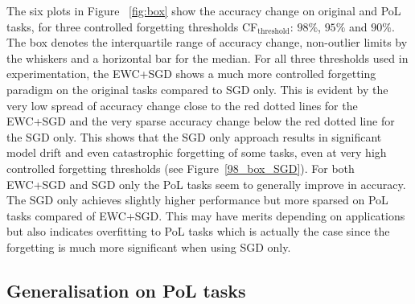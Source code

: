 The six plots in Figure ~\ref{fig:box} show the accuracy change on original and PoL tasks, for three controlled forgetting thresholds CF$_{\text{threshold}}$: $98\%$,  $95\%$ and $90\%$.
%
The box denotes the interquartile range of accuracy change, non-outlier limits by the whiskers and a horizontal bar for the median. 
%
For all three thresholds used in experimentation, the EWC+SGD shows a much more controlled forgetting paradigm on the original tasks compared to SGD only. 
%
This is evident by the very low spread of accuracy change close to the red dotted lines for the EWC+SGD and the very sparse accuracy change below the red dotted line for the SGD only.
%
This shows that the SGD only approach results in significant model drift and even catastrophic forgetting of some tasks, even at very high controlled forgetting thresholds (see Figure~\ref{98_box_SGD}).
%
For both EWC+SGD and SGD only the PoL tasks seem to generally improve in accuracy. 
%
The SGD only achieves slightly higher performance but more sparsed on PoL tasks compared of EWC+SGD. 
%
This may have merits depending on applications but also indicates overfitting to PoL tasks which is actually the case since the forgetting is much more significant when using SGD only.   


\subsection{Generalisation on PoL tasks}

